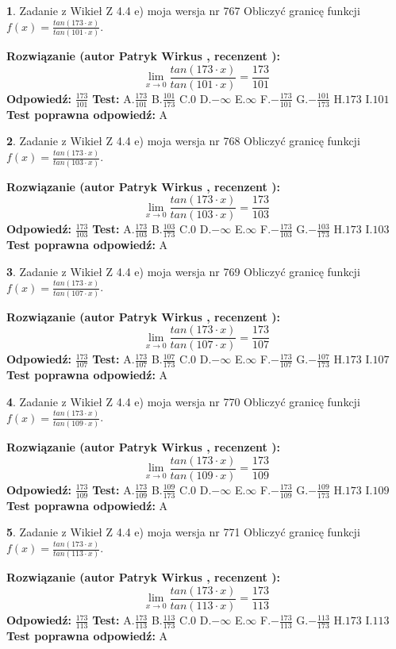 \documentclass[12pt, a4paper]{article}
\theoremstyle{definition} %
\newtheorem{zad}{}
\newcommand{\zadStart}[1]{\begin{zad}#1\newline}
\newcommand{\zadStop}{\end{zad}}
\newcommand{\rozwStart}[2]{\noindent \textbf{Rozwiązanie (autor #1 , recenzent #2): }\newline}
\newcommand{\rozwStop}{\newline}
\newcommand{\odpStart}{\noindent \textbf{Odpowiedź:}\newline}
\newcommand{\odpStop}{\newline}
\newcommand{\testStart}{\noindent \textbf{Test:}\newline}
\newcommand{\testStop}{\newline}
\newcommand{\kluczStart}{\noindent \textbf{Test poprawna odpowiedź:}\newline}
\newcommand{\kluczStop}{\newline}
\begin{document}
\zadStart{Zadanie z Wikieł Z 4.4 e) moja wersja nr 767}
Obliczyć granicę funkcji $f(x)=\frac{tan(173\cdot x)}{tan(101\cdot x)}$.
\zadStop
\rozwStart{Patryk Wirkus}{}
$$\lim\limits_{x\to 0}\frac{tan(173\cdot x)}{tan(101\cdot x)}=
\frac{173}{101}$$
\rozwStop
\odpStart
$\frac{173}{101}$
\odpStop
\testStart
A.$\frac{173}{101}$
B.$\frac{101}{173}$
C.$0$
D.$-\infty$
E.$\infty$
F.$-\frac{173}{101}$
G.$-\frac{101}{173}$
H.$173$
I.$101$
\testStop
\kluczStart
A
\kluczStop



\zadStart{Zadanie z Wikieł Z 4.4 e) moja wersja nr 768}
Obliczyć granicę funkcji $f(x)=\frac{tan(173\cdot x)}{tan(103\cdot x)}$.
\zadStop
\rozwStart{Patryk Wirkus}{}
$$\lim\limits_{x\to 0}\frac{tan(173\cdot x)}{tan(103\cdot x)}=
\frac{173}{103}$$
\rozwStop
\odpStart
$\frac{173}{103}$
\odpStop
\testStart
A.$\frac{173}{103}$
B.$\frac{103}{173}$
C.$0$
D.$-\infty$
E.$\infty$
F.$-\frac{173}{103}$
G.$-\frac{103}{173}$
H.$173$
I.$103$
\testStop
\kluczStart
A
\kluczStop



\zadStart{Zadanie z Wikieł Z 4.4 e) moja wersja nr 769}
Obliczyć granicę funkcji $f(x)=\frac{tan(173\cdot x)}{tan(107\cdot x)}$.
\zadStop
\rozwStart{Patryk Wirkus}{}
$$\lim\limits_{x\to 0}\frac{tan(173\cdot x)}{tan(107\cdot x)}=
\frac{173}{107}$$
\rozwStop
\odpStart
$\frac{173}{107}$
\odpStop
\testStart
A.$\frac{173}{107}$
B.$\frac{107}{173}$
C.$0$
D.$-\infty$
E.$\infty$
F.$-\frac{173}{107}$
G.$-\frac{107}{173}$
H.$173$
I.$107$
\testStop
\kluczStart
A
\kluczStop



\zadStart{Zadanie z Wikieł Z 4.4 e) moja wersja nr 770}
Obliczyć granicę funkcji $f(x)=\frac{tan(173\cdot x)}{tan(109\cdot x)}$.
\zadStop
\rozwStart{Patryk Wirkus}{}
$$\lim\limits_{x\to 0}\frac{tan(173\cdot x)}{tan(109\cdot x)}=
\frac{173}{109}$$
\rozwStop
\odpStart
$\frac{173}{109}$
\odpStop
\testStart
A.$\frac{173}{109}$
B.$\frac{109}{173}$
C.$0$
D.$-\infty$
E.$\infty$
F.$-\frac{173}{109}$
G.$-\frac{109}{173}$
H.$173$
I.$109$
\testStop
\kluczStart
A
\kluczStop



\zadStart{Zadanie z Wikieł Z 4.4 e) moja wersja nr 771}
Obliczyć granicę funkcji $f(x)=\frac{tan(173\cdot x)}{tan(113\cdot x)}$.
\zadStop
\rozwStart{Patryk Wirkus}{}
$$\lim\limits_{x\to 0}\frac{tan(173\cdot x)}{tan(113\cdot x)}=
\frac{173}{113}$$
\rozwStop
\odpStart
$\frac{173}{113}$
\odpStop
\testStart
A.$\frac{173}{113}$
B.$\frac{113}{173}$
C.$0$
D.$-\infty$
E.$\infty$
F.$-\frac{173}{113}$
G.$-\frac{113}{173}$
H.$173$
I.$113$
\testStop
\kluczStart
A
\kluczStop
\end{document}
